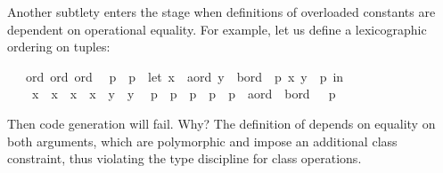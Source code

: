 \begin{isabellebody}
{}
\isamarkuptrue%
%
\begin{isamarkuptext}%
Another subtlety
  enters the stage when definitions of overloaded constants
  are dependent on operational equality.  For example, let
  us define a lexicographic ordering on tuples:%
\end{isamarkuptext}%
\isamarkuptrue%
%
\isadelimML
%
\endisadelimML
%
\isatagML
%
\endisatagML
{\isafoldML}%
%
\isadelimML
%
\endisadelimML
\isanewline
{}\isamarkupfalse%
\ {\isacharasterisk}\ {\isacharcolon}{\isacharcolon}\ {\isacharparenleft}ord{\isacharcomma}\ ord{\isacharparenright}\ ord\isanewline
\ \ {\isachardoublequoteopen}p{}\ {\isacharless}\ p{}\ {\isasymequiv}\ let\ {\isacharparenleft}x{}\ {\isasymColon}\ {\isacharprime}a{\isasymColon}ord{\isacharcomma}\ y{}\ {\isasymColon}\ {\isacharprime}b{\isasymColon}ord{\isacharparenright}\ {\isacharequal}\ p{}{\isacharsemicolon}\ {\isacharparenleft}x{}{\isacharcomma}\ y{}{\isacharparenright}\ {\isacharequal}\ p{}\ in\isanewline
\ \ \ \ x{}\ {\isacharless}\ x{}\ {\isasymor}\ {\isacharparenleft}x{}\ {\isacharequal}\ x{}\ {\isasymand}\ y{}\ {\isacharless}\ y{}{\isacharparenright}{\isachardoublequoteclose}\isanewline
\ \ {\isachardoublequoteopen}p{}\ {\isasymle}\ p{}\ {\isasymequiv}\ p{}\ {\isacharless}\ p{}\ {\isasymor}\ {\isacharparenleft}p{}\ {\isasymColon}\ {\isacharprime}a{\isasymColon}ord\ {\isasymtimes}\ {\isacharprime}b{\isasymColon}ord{\isacharparenright}\ \ {\isacharequal}\ p{}{\isachardoublequoteclose}%
\isadelimproof
\ %
\endisadelimproof
%
\isatagproof
\isacommand{{\isachardot}{\isachardot}}\isamarkupfalse%
\isanewline
%
\endisatagproof
{\isafoldproof}%
%
\isadelimproof
%
\endisadelimproof
%
\isadelimML
%
\endisadelimML
%
\isatagML
%
\endisatagML
{\isafoldML}%
%
\isadelimML
%
\endisadelimML
%
\begin{isamarkuptext}%
Then code generation will fail.  Why?  The definition
  of  depends on equality on both arguments,
  which are polymorphic and impose an additional 
  class constraint, thus violating the type discipline
  for class operations.


\end{isamarkuptext}
\end{isabellebody}
